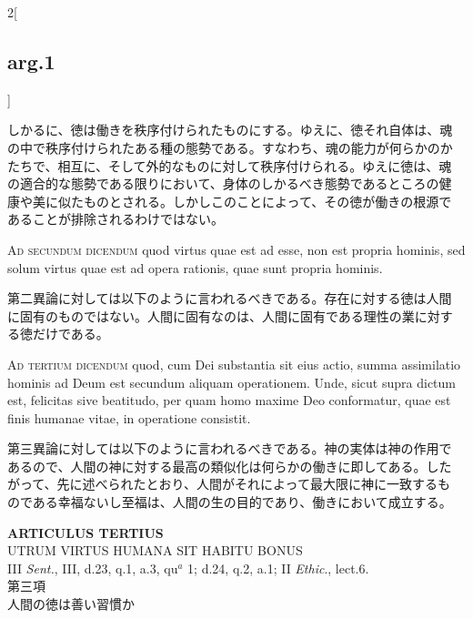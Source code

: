 \documentclass[paper=a4paper,fontsize=10pt,jafontsize=9pt,titlepage]{jlreq}
\begin{document}
\begin{paracol}{2}[\subsection{arg.1}]
\switchcolumn

しかるに、徳は働きを秩序付けられたものにする。ゆえに、徳それ自体は、魂
の中で秩序付けられたある種の態勢である。すなわち、魂の能力が何らかのか
たちで、相互に、そして外的なものに対して秩序付けられる。ゆえに徳は、魂
の適合的な態勢である限りにおいて、身体のしかるべき態勢であるところの健
康や美に似たものとされる。しかしこのことによって、その徳が働きの根源で
あることが排除されるわけではない。

\switchcolumn*[\subsection{ad.2}]

{\scshape Ad secundum dicendum} quod virtus quae est ad esse, non est
propria hominis, sed solum virtus quae est ad opera rationis, quae
sunt propria hominis.

\switchcolumn

第二異論に対しては以下のように言われるべきである。存在に対する徳は人間
に固有のものではない。人間に固有なのは、人間に固有である理性の業に対す
る徳だけである。

\switchcolumn*[\subsection{ad.3}]

{\scshape Ad tertium dicendum} quod, cum Dei substantia sit eius
actio, summa assimilatio hominis ad Deum est secundum aliquam
operationem. Unde, sicut supra dictum est, felicitas sive beatitudo,
per quam homo maxime Deo conformatur, quae est finis humanae vitae, in
operatione consistit.

\switchcolumn

第三異論に対しては以下のように言われるべきである。神の実体は神の作用で
あるので、人間の神に対する最高の類似化は何らかの働きに即してある。した
がって、先に述べられたとおり、人間がそれによって最大限に神に一致するも
のである幸福ないし至福は、人間の生の目的であり、働きにおいて成立する。

\end{paracol}
\newpage
{}
{}
\setcounter{section}{3}
\setcounter{subsection}{0}


\begin{center}
{\Large {\bfseries ARTICULUS TERTIUS}}\\
{\large UTRUM VIRTUS HUMANA SIT HABITU BONUS}\\
{\footnotesize III {\itshape Sent.}, III, d.23, q.1, a.3, qu$^{a}$ 1; d.24, q.2, a.1; II {\itshape Ethic}., lect.6.}\\
{\Large 第三項\\人間の徳は善い習慣か}
\end{center}
\end{document}
